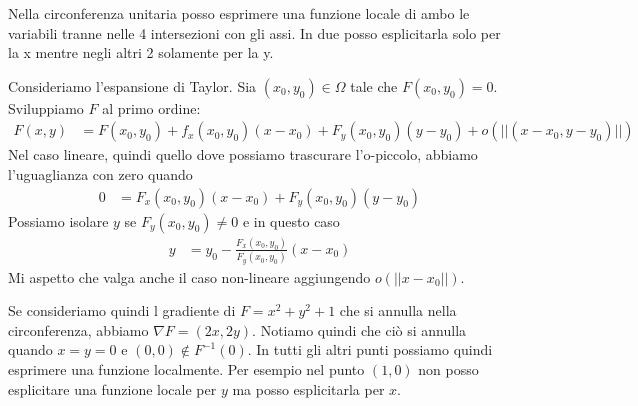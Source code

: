 \documentclass[a4paper]{article}
\begin{document}
Nella circonferenza unitaria posso esprimere una funzione locale di ambo le variabili
tranne nelle 4 intersezioni con gli assi.
In due posso esplicitarla solo per la x mentre negli altri 2 solamente per la y.

Consideriamo l'espansione di Taylor.
Sia \((x_0, y_0) \in \Omega\) tale che \(F(x_0, y_0) = 0\).
Sviluppiamo \(F\) al primo ordine:
\begin{align*}
    F(x,y) &= F(x_0, y_0) + f_x(x_0, y_0)(x-x_0)
    + F_y(x_0, y_0)(y-y_0) + o(||(x-x_0, y-y_0)||)
\end{align*}
Nel caso lineare, quindi quello dove possiamo trascurare l'o-piccolo,
abbiamo l'uguaglianza con zero quando
\begin{align*}
    0 &= 
    F_x(x_0, y_0)(x-x_0)
    + F_y(x_0, y_0)(y-y_0)
\end{align*}
Possiamo isolare \(y\) se \(F_y(x_0, y_0) \neq 0\)
e in questo caso
\begin{align*}
    y &= y_0 - \frac{F_x(x_0, y_0)}{F_y(x_0, y_0)}(x-x_0)
\end{align*}
Mi aspetto che valga anche il caso non-lineare aggiungendo \(o(||x-x_0||)\).

Se consideriamo quindi l gradiente di \(F = x^2 + y^2 + 1\)
che si annulla nella circonferenza, abbiamo \(\nabla F = (2x, 2y)\).
Notiamo quindi che ciò si annulla quando \(x=y=0\)
e \((0,0) \notin F^{-1}(0)\). In tutti gli altri punti possiamo quindi esprimere una
funzione localmente.
Per esempio nel punto \((1,0)\) non posso esplicitare una funzione locale
per \(y\) ma posso esplicitarla per \(x\).

\end{document}
